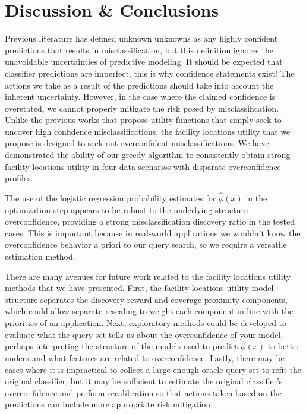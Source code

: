 \documentclass[letterpaper]{article} %
\begin{document}
\section{Discussion \& Conclusions}

Previous literature has defined unknown unknowns as any highly confident predictions that results in misclassification, but this definition ignores the unavoidable uncertainties of predictive modeling. It should be expected that classifier predictions are imperfect, this is why confidence statements exist! The actions we take as a result of the predictions should take into account the inherent uncertainty. However, in the case where the claimed confidence is overstated, we cannot properly mitigate the risk posed by misclassification. Unlike the previous works that propose utility functions that simply seek to uncover high confidence misclassifications, the facility locations utility that we propose is designed to seek out overconfident misclassifications. We have demonstrated the ability of our greedy algorithm to consistently obtain strong facility locations utility in four data scenarios with disparate overconfidence profiles. 

The use of the logistic regression probability estimates for $\hat{\phi}(x)$ in the optimization step appears to be robust to the underlying structure overconfidence, providing a strong misclassification discovery ratio in the tested cases. This is important because in real-world applications we wouldn’t know the overconfidence behavior a priori to our query search, so we require a versatile estimation method. 

There are many avenues for future work related to the facility locations utility methods that we have presented. First, the facility locations utility model structure separates the discovery reward and coverage proximity components, which could allow separate rescaling to weight each component in line with the priorities of an application. Next, exploratory methods could be developed to evaluate what the query set tells us about the overconfidence of your model, perhaps interpreting the structure of the models used to predict $\hat{\phi}(x)$ to better understand what features are related to overconfidence. Lastly, there may be cases where it is impractical to collect a large enough oracle query set to refit the original classifier, but it may be sufficient to estimate the original classifier’s overconfidence and perform recalibration so that actions taken based on the predictions can include more appropriate risk mitigation. 


\newpage



\end{document}
